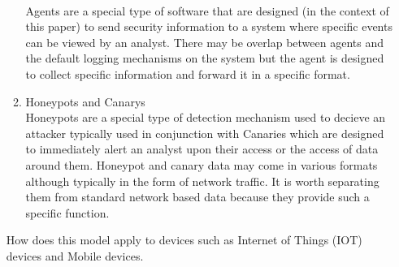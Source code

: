 \begin{enumerate}
\begin{enumerate}
            \\Agents are a special type of software that are designed (in the context of this paper) to send security information to a system where specific events can be viewed by an analyst. 
            There may be overlap between agents and the default logging mechanisms on the system but the agent is designed to collect specific information and forward it in a specific format.
            \item Honeypots and Canarys\cite{jasek2013apt}
            \\Honeypots are a special type of detection mechanism used to decieve an attacker typically used in conjunction with Canaries which are designed to immediately alert an analyst upon their access or the access of data around them.
            Honeypot and canary data may come in various formats although typically in the form of network traffic. 
            It is worth separating them from standard network based data because they provide such a specific function. 
        \end{enumerate}
    How does this model apply to devices such as Internet of Things (IOT) devices and Mobile devices.
\end{enumerate}